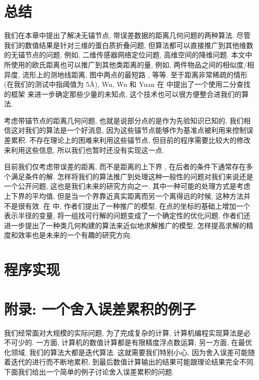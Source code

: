 \documentclass{CASthesis_zzk}
\begin{document}
\section{总结}
\label{sec:summary}
我们在本章中提出了解决无锚节点, 带误差数据的距离几何问题的两种算法.
尽管我们的数值结果是针对三维的蛋白质折叠问题, 
但算法都可以直接推广到其他维数的无锚节点的问题,
例如, 二维传感器网络定位问题, 高维空间的降维问题.
本文中所使用的欧氏距离也可以推广到其他类距离的量,
例如, 两件物品之间的相似度/相异度, 流形上的测地线距离,
图中两点的最短路 \cite{Isomap2000}, 等等. 
至于距离非常稀疏的情形 (在我们的测试中指阈值为 5\AA ), 
Wu, Wu 和 Yuan 在 \cite{Wu2008} 中提出了一个使用二分查找的框架
来进一步确定那些少量的未知点,
这个技术也可以很方便整合进我们的算法.

考虑带锚节点的距离几何问题, 也就是说部分点的是作为先验知识已知的,
我们相信这对我们的算法是一个好消息, 
因为这些锚节点能够作为基准点被利用来控制误差累积.
不存在理论上的困难来利用这些锚节点,
但目前的程序需要比较大的修改来利用这些信息,
所以我们也暂时还没有实现这一点.

目前我们仅考虑带误差的距离,
而不是距离的上下界 \cite{Biswas2008,Fang2013,Sit2011,Voller2013}, 
在后者的条件下通常存在多个满足条件的解.
怎样将我们的算法推广到处理这种一般性的问题对我们来说还是一个公开问题,
这也是我们未来的研究方向之一.
其中一种可能的处理方式是考虑上下界的平均值,
但是当一个界靠近真实距离而另一个离得远的时候, 这种方法并不是很有效.
在 \cite{Sit2011,Voller2013} 中, 作者们提出了一种推广的模型,
在点的坐标的基础上增加一个表示半径的变量,
将一组找可行解的问题变成了一个确定性的优化问题.
作者们还进一步提出了一种类几何构建的算法来近似地求解推广的模型,
怎样提高求解的精度和效率也是未来的一个有趣的研究方向. 



\section{程序实现}
\label{sec:CodeWrite}


\section{附录: 一个舍入误差累积的例子}
\label{sec:ErrExample}
我们经常面对大规模的实际问题, 为了完成复杂的计算, 
计算机编程实现算法是必不可少的.
一方面, 计算机的数值计算都是有限精度浮点数运算;
另一方面, 在最优化领域, 我们的算法大都是迭代算法.
这就需要我们特别小心, 因为舍入误差可能随着迭代的进行而不断地累积,
到最后数值计算输出的结果可能跟理论结果完全不同.
下面我们给出一个简单的例子讨论舍入误差累积的问题.
\end{document}
